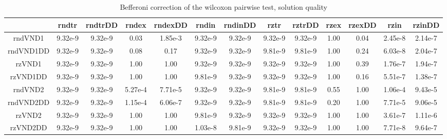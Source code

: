\documentclass[12pt,a4paper]{article}
\begin{document}
\begin{table}[!h]
\leftskip -2.55cm
{
\footnotesize
\begin{tabular}{|*{13}{c|}}
  \hline
	 & rndtr & rndtrDD & rndex & rndexDD & rndin & rndinDD & rztr & rztrDD & rzex & rzexDD & rzin & rzinDD \\
  \hline
	rndVND1 & 9.32e-9 & 9.32e-9 & 0.03 & 1.85e-3 & 9.32e-9 & 9.32e-9 & 9.32e-9 & 9.32e-9 & 1.00 & 0.04 & 2.45e-8 & 2.14e-7 \\
	rndVND1DD & 9.32e-9 & 9.32e-9 & 0.08 & 0.17 & 9.32e-9 & 9.32e-9 & 9.81e-9 & 9.81e-9 & 1.00 & 0.24 & 6.03e-8 & 2.04e-7 \\ 
	rzVND1 & 9.32e-9 & 9.32e-9 & 1.00 & 1.00 & 9.32e-9 & 9.32e-9 & 9.32e-9 & 9.32e-9 & 1.00 & 0.39 & 1.76e-7 & 1.94e-7 \\
	rzVND1DD & 9.32e-9 & 9.32e-9 & 1.00 & 1.00 & 9.81e-9 & 9.32e-9 & 9.32e-9 & 9.32e-9 & 1.00 & 0.16 & 5.51e-7 & 1.38e-7 \\ 
	rndVND2 & 9.32e-9 & 9.32e-9 & 5.27e-4 & 7.71e-5 & 9.32e-9 & 9.32e-9 & 9.81e-9 & 9.81e-9 & 0.55 & 1.00 & 1.06e-4 & 9.43e-5 \\
	rndVND2DD & 9.32e-9 & 9.32e-9 & 1.15e-4 & 6.06e-7 & 9.32e-9 & 9.32e-9 & 9.81e-9 & 9.81e-9 & 0.20 & 1.00 & 7.71e-5 & 9.06e-5 \\ 
	rzVND2 & 9.32e-9 & 9.32e-9 & 1.00 & 1.00 & 9.81e-9 & 9.32e-9 & 9.32e-9 & 9.32e-9 & 1.00 & 1.00 & 3.61e-7 & 1.11e-6 \\
	rzVND2DD & 9.32e-9 & 9.32e-9 & 1.00 & 1.00 & 1.03e-8 & 9.81e-9 & 9.32e-9 & 9.32e-9 & 1.00 & 1.00 & 7.71e-8 & 9.64e-7 \\
  \hline
\end{tabular}
\normalsize
}
\caption{Befferoni correction of the wilcoxon pairwise test, solution quality}
\label{Befferoni correction of the wilcoxon pairwise test VND-single neighbourhood}
\end{table} 
\end{document}

